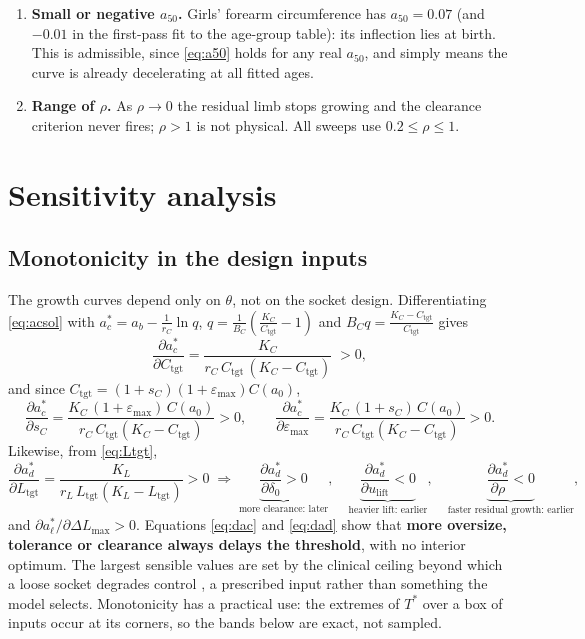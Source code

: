 \documentclass[11pt]{article}
\newcommand{\pd}[2]{\frac{\partial #1}{\partial #2}}
\newcommand{\eps}{\varepsilon}
\newcommand{\lift}{u_{\mathrm{lift}}}
\newcommand{\tgt}{\mathrm{tgt}}
\theoremstyle{definition}
\begin{document}
\begin{enumerate}[label=\textbf{E\arabic*.},ref=E\arabic*,leftmargin=2.6em,itemsep=2pt]
\item \textbf{Small or negative $a_{50}$.} Girls' forearm circumference has $a_{50}=0.07$ (and $-0.01$ in the first-pass fit to the age-group table): its inflection lies at birth. This is admissible, since \eqref{eq:a50} holds for any real $a_{50}$, and simply means the curve is already decelerating at all fitted ages.
\item \textbf{Range of $\rho$.} As $\rho\to0$ the residual limb stops growing and the clearance criterion never fires; $\rho>1$ is not physical. All sweeps use $0.2\le\rho\le1$.
\end{enumerate}

\section{Sensitivity analysis}
\label{sec:sens}

\subsection{Monotonicity in the design inputs}
The growth curves depend only on $\theta$, not on the socket design. Differentiating \eqref{eq:acsol} with $a^*_c=a_b-\frac1{r_C}\ln q$, $q=\frac1{B_C}(\frac{K_C}{C_\tgt}-1)$ and $B_Cq=\frac{K_C-C_\tgt}{C_\tgt}$ gives
\begin{equation}
\pd{a^*_c}{C_\tgt}
=\frac{K_C}{r_C\,C_\tgt\,(K_C-C_\tgt)}\;>0,
\label{eq:dacdCtgt}
\end{equation}
and since $C_\tgt=(1+s_C)(1+\eps_{\max})C(a_0)$,
\begin{equation}
\pd{a^*_c}{s_C}=\frac{K_C\,(1+\eps_{\max})\,C(a_0)}{r_C\,C_\tgt(K_C-C_\tgt)}>0,
\qquad
\pd{a^*_c}{\eps_{\max}}=\frac{K_C\,(1+s_C)\,C(a_0)}{r_C\,C_\tgt(K_C-C_\tgt)}>0 .
\label{eq:dac}
\end{equation}
Likewise, from \eqref{eq:Ltgt},
\begin{equation}
\pd{a^*_d}{L_\tgt}=\frac{K_L}{r_L\,L_\tgt(K_L-L_\tgt)}>0
\;\Rightarrow\;
\underbrace{\pd{a^*_d}{\delta_0}>0}_{\text{more clearance: later}},
\quad
\underbrace{\pd{a^*_d}{\lift}<0}_{\text{heavier lift: earlier}},
\quad
\underbrace{\pd{a^*_d}{\rho}<0}_{\text{faster residual growth: earlier}} ,
\label{eq:dad}
\end{equation}
and $\partial a^*_\ell/\partial\Delta L_{\max}>0$. Equations \eqref{eq:dac} and \eqref{eq:dad} show that \textbf{more oversize, tolerance or clearance always delays the threshold}, with no interior optimum. The largest sensible values are set by the clinical ceiling beyond which a loose socket degrades control \cite{ghidini2025}, a prescribed input rather than something the model selects. Monotonicity has a practical use: the extremes of $T^*$ over a box of inputs occur at its corners, so the bands below are exact, not sampled.
\end{document}
